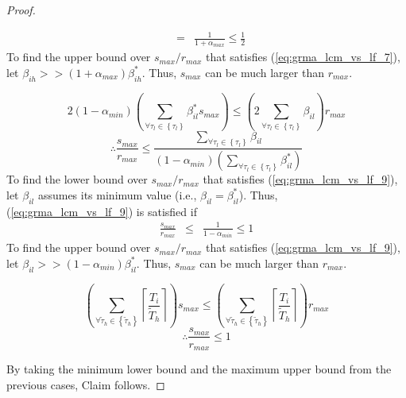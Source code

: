 \begin{proof}
\begin{compactitem}
\begin{eqnarray}
 & = & \frac{1}{1+\alpha_{max}}\le\frac{1}{2}\label{eq:grma_lcm_vs_lf_8}
\end{eqnarray}
To find the upper bound over $s_{max}/r_{max}$ that satisfies (\ref{eq:grma_lcm_vs_lf_7}),
let $\beta_{ih}>>\left(1+\alpha_{max}\right)\beta_{ih}^{*}$. Thus,
$s_{max}$ can be much larger than $r_{max}$.
%
\item 
\[
2\left(1-\alpha_{min}\right)\left(\sum_{\forall\tau_{l}\in\left\{ \tau_{l}\right\} }\beta_{il}^{*}s_{max}\right)\le\left(2\sum_{\forall\tau_{l}\in\left\{ \tau_{l}\right\} }\beta_{il}\right)r_{max}
\]
\begin{equation}
\therefore\frac{s_{max}}{r_{max}}\le\frac{\sum_{\forall\tau_{l}\in\left\{ \tau_{l}\right\} }\beta_{il}}{\left(1-\alpha_{min}\right)\left(\sum_{\forall\tau_{l}\in\left\{ \tau_{l}\right\} }\beta_{il}^{*}\right)}\label{eq:grma_lcm_vs_lf_9}
\end{equation}
To find the lower bound over $s_{max}/r_{max}$ that satisfies (\ref{eq:grma_lcm_vs_lf_9}),
let $\beta_{il}$ assumes its minimum value (i.e., $\beta_{il}=\beta_{il}^{*}$).
Thus, (\ref{eq:grma_lcm_vs_lf_9}) is satisfied if 
\begin{eqnarray}
\frac{s_{max}}{r_{max}} & \le & \frac{1}{1-\alpha_{min}}\le1\label{eq:grma_lcm_vs_lf_10}
\end{eqnarray}
To find the upper bound over $s_{max}/r_{max}$ that satisfies (\ref{eq:grma_lcm_vs_lf_9}),
let $\beta_{il}>>\left(1-\alpha_{min}\right)\beta_{il}^{*}$. Thus,
$s_{max}$ can be much larger than $r_{max}$.
%
\item 
\begin{equation}
\left(\sum_{\forall\tilde{\tau}_{h}\in\left\{ \tilde{\tau}_{h}\right\} }\left\lceil \frac{T_{i}}{\tilde{T}_{h}}\right\rceil \right)s_{max}\le\left(\sum_{\forall\tilde{\tau}_{h}\in\left\{ \tilde{\tau}_{h}\right\} }\left\lceil \frac{T_{i}}{\tilde{T}_{h}}\right\rceil \right)r_{max}\label{eq:grma_lcm_vs_lf_11}
\end{equation}
\[
\therefore\frac{s_{max}}{r_{max}}\le1
\]
\end{compactitem}
%
By taking the minimum lower bound and the maximum upper bound from
the previous cases, Claim follows.
%
\end{proof}
%
